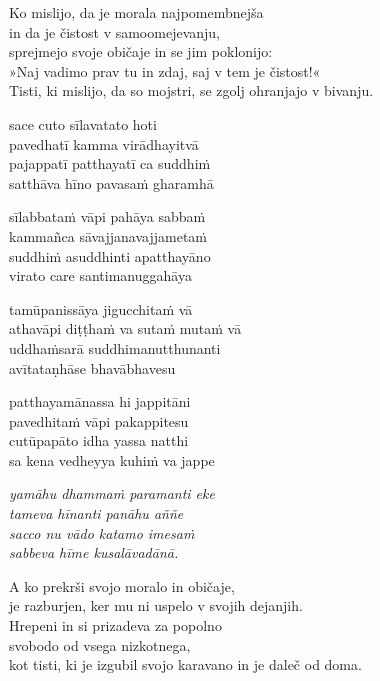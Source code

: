Ko mislijo, da je morala najpomembnejša\\\vin in da je čistost v samoomejevanju,\\
sprejmejo svoje običaje in se jim poklonijo:\\
»Naj vadimo prav tu in zdaj, saj v tem je čistost!«\\
Tisti, ki mislijo, da so mojstri, se zgolj ohranjajo v bivanju.


\clearpage

sace cuto sīlavatato hoti\\
pavedhatī kamma virādhayitvā\\
pajappatī patthayatī ca suddhiṁ\\
satthāva hīno pavasaṁ gharamhā

sīlabbataṁ vāpi pahāya sabbaṁ\\
kammañca sāvajjanavajjametaṁ\\
suddhiṁ asuddhinti apatthayāno\\
virato care santimanuggahāya

tamūpanissāya jigucchitaṁ vā\\
athavāpi diṭṭhaṁ va sutaṁ mutaṁ vā\\
uddhaṁsarā suddhimanutthunanti\\
avītataṇhāse bhavābhavesu

patthayamānassa hi jappitāni\\
pavedhitaṁ vāpi pakappitesu\\
cutūpapāto idha yassa natthi\\
sa kena vedheyya kuhiṁ va jappe

\emph{yamāhu dhammaṁ paramanti eke\\
tameva hīnanti panāhu aññe}\\
\emph{sacco nu vādo katamo imesaṁ\\
sabbeva hīme kusalāvadānā.}


\clearpage

A ko prekrši svojo moralo in običaje,\\
je razburjen, ker mu ni uspelo v svojih dejanjih.\\
Hrepeni in si prizadeva za popolno\\\vin svobodo od vsega nizkotnega,\\
kot tisti, ki je izgubil svojo karavano in je daleč od doma.

